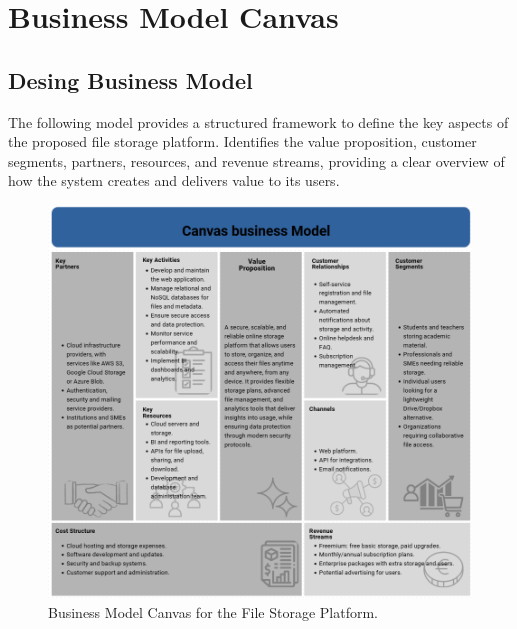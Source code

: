 \section{Business Model Canvas}
\subsection{Desing Business Model}
The following model provides a structured framework to define the key aspects of the proposed file storage platform. Identifies the value proposition, customer segments, partners, resources, and revenue streams, providing a clear overview of how the system creates and delivers value to its users. \\

\begin{figure}[H]
    \centering
    \includegraphics[width=\linewidth,height=0.95\textheight,keepaspectratio]{bussinessmodel/BusinessModel.png}
    \caption{Business Model Canvas for the File Storage Platform.}
    \label{fig:business_model}
\end{figure}
